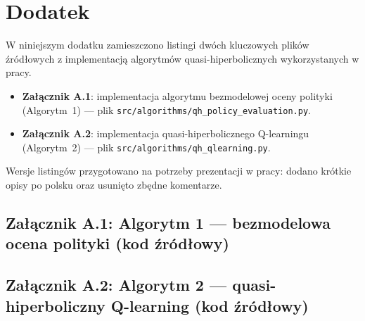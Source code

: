 \chapter{Dodatek}

W niniejszym dodatku zamieszczono listingi dwóch kluczowych plików źródłowych z implementacją algorytmów quasi-hiperbolicznych wykorzystanych w pracy.

\begin{itemize}
    \item \textbf{Załącznik A.1}: implementacja algorytmu bezmodelowej oceny polityki (Algorytm~1) — plik \texttt{src/algorithms/qh\_policy\_evaluation.py}.
    \item \textbf{Załącznik A.2}: implementacja quasi-hiperbolicznego Q-learningu (Algorytm~2) — plik \texttt{src/algorithms/qh\_qlearning.py}.
\end{itemize}

Wersje listingów przygotowano na potrzeby prezentacji w pracy: dodano krótkie opisy po polsku oraz usunięto zbędne komentarze.

\lstset{
    basicstyle=\ttfamily\small,
    breaklines=true,
    columns=fullflexible,
    keepspaces=true,
    showstringspaces=false,
    inputencoding=utf8,
    extendedchars=true
}

\section{Załącznik A.1: Algorytm 1 — bezmodelowa ocena polityki (kod źródłowy)}


\section{Załącznik A.2: Algorytm 2 — quasi-hiperboliczny Q-learning (kod źródłowy)}

